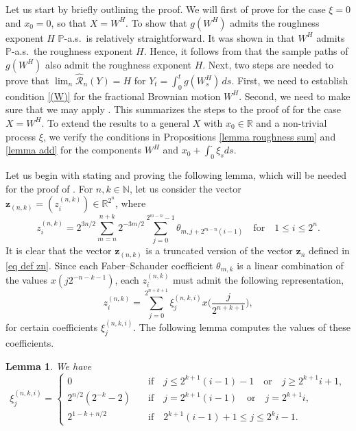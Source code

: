 \documentclass[12pt,reqno]{article}
\def\wh{\widehat}
\numberwithin{equation}{section}
\def\cR{{\mathscr R}}
\newtheorem{lemma}[theorem]{Lemma}
\theoremstyle{definition}
\def\wh{\widehat}
\newcommand{\bR}{\mathbb{R}}
\newcommand{\bN}{\mathbb{N}}
\newcommand{\bP}{\mathbb{P}}
\begin{document}
 Let us start by briefly outlining  the proof. We will first of prove  for the case $\xi = 0$ and $x_0 = 0$, so that $X = W^H$. To show that  $ g(W^H)$ admits the roughness exponent $H$ $\bP$-a.s.~is relatively straightforward. It was shown in \cite[Theorem 5.1]{HanSchiedHurst} that $W^H$ admits $\bP$-a.s.~the roughness exponent $H$. Hence, it follows from   that the sample paths of $ g(W^H)$ also admit the roughness exponent $H$.  Next, two steps are needed to prove that $\lim_n \wh \cR_n(Y) = H$ for $Y_t = \int_0^t g(W^H_s)\,ds$. First, we need to establish condition \eqref{(W)} for the fractional Brownian motion $W^H$. Second,  we need to make sure that we may apply . This summarizes the steps to the proof of  for the case $X = W^H$. To extend the results to a general $X$ with $x_0 \in \bR$ and a non-trivial process $\xi$, we verify the conditions in Propositions \ref{lemma roughness sum} and \ref{lemma add} for the components $W^H$ and $x_0 + \int_0^\cdot \xi_s ds$.

Let us begin with stating and proving the following lemma, which will be needed for the proof of . For $n,k \in \bN$, let us consider the vector $\bm z_{(n,k)} = (z^{(n,k)}_i) \in \bR^{2^n}$, where 
\begin{equation}\label{eq znk}
	z^{(n,k)}_i = 2^{3n/2}\sum_{m = n}^{n+k}2^{-3m/2}\sum_{j = 0}^{2^{m-n}-1}\theta_{m,j+2^{m-n}(i-1)} \quad \text{for} \quad 1 \le i \le 2^n.
\end{equation}
It is clear that the vector $\bm z_{(n,k)}$ is a truncated version of the vector $\bm z_n$ defined in \eqref{eq def zn}. Since each Faber--Schauder coefficient $\theta_{m,k}$ is  a linear combination  of the values $x(j2^{-n-k-1})$,  each $z^{(n,k)}_i$ must admit the following representation,
\begin{equation}\label{eq xi n}
	z^{(n,k)}_i = \sum_{j = 0}^{2^{n+k+1}}\xi^{(n,k,i)}_j x\Big(\frac{j}{2^{n+k+1}}\Big),
\end{equation}
for certain coefficients $\xi^{(n,k,i)}_j$. The following lemma computes the values of these coefficients. 

\begin{lemma}\label{Lemma xi n}
	We have 
	\begin{equation}\label{eq xi represent}
		\xi_{j}^{(n,k,i)}   = \begin{cases}
			0 &\quad \text{if} \quad j \le 2^{k+1}(i-1)-1 \quad \text{or} \quad j \ge 2^{k+1}i+1,\\
			2^{n/2}(2^{-k}-2) &\quad \text{if} \quad j =  2^{k+1}(i-1) \quad \text{or} \quad j = 2^{k+1}i,\\
			2^{1-k+n/2} &\quad \text{if} \quad  2^{k+1}(i-1)+1 \le j \le 2^{k}i-1.
		\end{cases}
	\end{equation}
\end{lemma}
\end{document}
